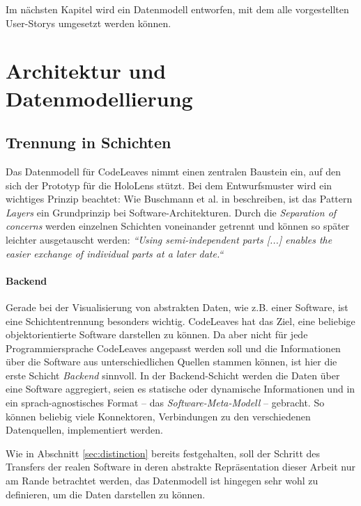 Im nächsten Kapitel wird ein Datenmodell entworfen, mit dem alle vorgestellten User-Storys umgesetzt werden können.

\chapter{Architektur und Datenmodellierung}
\label{ch:data-model}
\section{Trennung in Schichten}
\label{ch:data-layers}

Das Datenmodell für CodeLeaves nimmt einen zentralen Baustein ein, auf den sich der Prototyp für die HoloLens stützt. Bei dem Entwurfsmuster wird ein wichtiges Prinzip beachtet: Wie Buschmann et al. in \cite{frank2007pattern} beschreiben, ist das Pattern \textit{Layers} ein Grundprinzip bei Software-Architekturen. Durch die \textit{Separation of concerns} werden einzelnen Schichten voneinander getrennt und können so später leichter ausgetauscht werden: \textit{``Using semi-independent parts [...] enables the easier exchange of individual parts at a later date.``} \cite{frank2007pattern}

\subsubsection*{Backend}
Gerade bei der Visualisierung von abstrakten Daten, wie z.B. einer Software, ist eine Schichtentrennung besonders wichtig. CodeLeaves hat das Ziel, eine %
beliebige objektorientierte Software darstellen zu können. Da aber nicht für jede Programmiersprache CodeLeaves angepasst werden soll und die Informationen über die Software aus unterschiedlichen Quellen stammen können, ist hier die erste Schicht \textit{Backend} sinnvoll. In der Backend-Schicht werden die Daten über eine Software aggregiert, seien es statische oder dynamische Informationen und in ein sprach-agnostisches Format -- das \textit{Software-Meta-Modell} -- gebracht. So können beliebig viele Konnektoren, Verbindungen zu den verschiedenen Datenquellen, implementiert werden.

Wie in Abschnitt \ref{sec:distinction} bereits festgehalten, soll der Schritt des Transfers der realen Software in deren abstrakte Repräsentation dieser Arbeit nur am Rande betrachtet werden, das Datenmodell ist hingegen sehr wohl zu definieren, um die Daten darstellen zu können.

